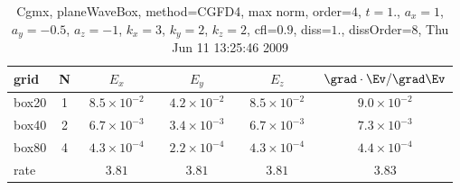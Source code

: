 \begin{table}[hbt]\tableFont %
\begin{center}
\begin{tabular}{|l|c|c|c|c|c|} \hline 
grid  & N &  $E_x$ &  $E_y$ & $E_z$ & $\grad\cdot\Ev/\grad\Ev$\\ \hline 
               box20 &     1 & ~$8.5\times10^{ -2}$~ & ~$4.2\times10^{ -2}$~ & ~$8.5\times10^{ -2}$~ & ~$9.0\times10^{ -2}$~  \\ \hline
               box40 &     2 & ~$6.7\times10^{ -3}$~ & ~$3.4\times10^{ -3}$~ & ~$6.7\times10^{ -3}$~ & ~$7.3\times10^{ -3}$~  \\ \hline
               box80 &     4 & ~$4.3\times10^{ -4}$~ & ~$2.2\times10^{ -4}$~ & ~$4.3\times10^{ -4}$~ & ~$4.4\times10^{ -4}$~  \\ \hline
    rate             &       &       $3.81$          &       $3.81$          &       $3.81$          &       $3.83$           \\ \hline
\end{tabular}
\caption{Cgmx, planeWaveBox, method=CGFD4, max norm, order=$4$, $t=1.$, $a_x=1$,  $a_y=-0.5$, $a_z=-1$,  $k_x=3$,  $k_y=2$, $k_z=2$, cfl=$0.9$, diss=$1.$, dissOrder=$8$, Thu Jun 11 13:25:46 2009}\label{table:planeWaveBoxNFDTDOrder4max}
\end{center}
\end{table}
